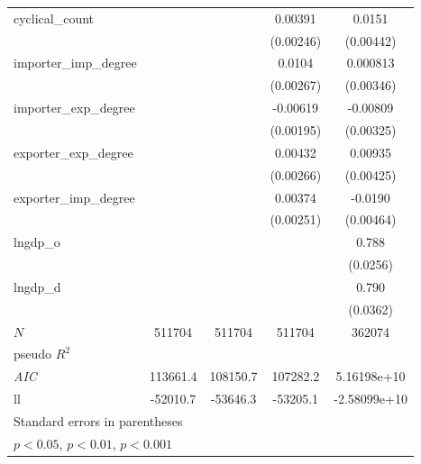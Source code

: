 {\begin{tabular}{l*{4}{c}}
cyclical\_count&                  &                  &  0.00391         &   0.0151\sym{***}\\
          &                  &                  &(0.00246)         &(0.00442)         \\

importer\_imp\_degree&                  &                  &   0.0104\sym{***}& 0.000813         \\
          &                  &                  &(0.00267)         &(0.00346)         \\

importer\_exp\_degree&                  &                  & -0.00619\sym{**} & -0.00809\sym{*}  \\
          &                  &                  &(0.00195)         &(0.00325)         \\

exporter\_exp\_degree&                  &                  &  0.00432         &  0.00935\sym{*}  \\
          &                  &                  &(0.00266)         &(0.00425)         \\

exporter\_imp\_degree&                  &                  &  0.00374         &  -0.0190\sym{***}\\
          &                  &                  &(0.00251)         &(0.00464)         \\

lngdp\_o   &                  &                  &                  &    0.788\sym{***}\\
          &                  &                  &                  & (0.0256)         \\

lngdp\_d   &                  &                  &                  &    0.790\sym{***}\\
          &                  &                  &                  & (0.0362)         \\
\hline
\(N\)     &   511704         &   511704         &   511704         &   362074         \\
pseudo \(R^{2}\)&                  &                  &                  &                  \\
\textit{AIC}& 113661.4         & 108150.7         & 107282.2         &5.16198e+10         \\
ll        & -52010.7         & -53646.3         & -53205.1         &-2.58099e+10         \\
\hline\hline
\multicolumn{5}{l}{\footnotesize Standard errors in parentheses}\\
\multicolumn{5}{l}{\footnotesize \sym{*} \(p<0.05\), \sym{**} \(p<0.01\), \sym{***} \(p<0.001\)}\\
\end{tabular}
}
